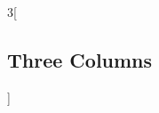 \documentclass{article}
\begin{document}
\begin{multicols}{3}[\subsection{Three Columns}]
\lipsum[4-6]
\end{multicols}

\newpage



\end{document}
